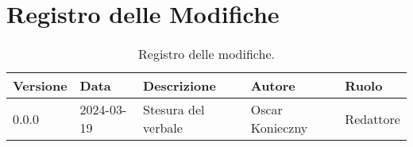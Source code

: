\section*{Registro delle Modifiche}
\begin{table}[ht!]	
		\centering
		\begin{tabular}{p{1.2cm} p{2cm} p{6cm} p{3cm} p{2cm}}
			\toprule
			\textbf{Versione}& \textbf{Data} & \textbf{Descrizione} & \textbf{Autore} & \textbf{Ruolo} \\
			\midrule
			0.0.0 & 2024-03-19 & Stesura del verbale  & Oscar Konieczny & Redattore \\
			\bottomrule
		\end{tabular}
		\caption{Registro delle modifiche.}
		\label{table:Registro delle modifiche}
\end{table}
